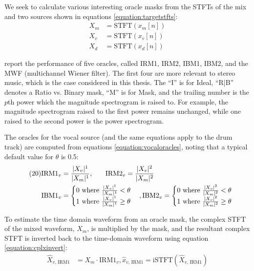 \documentclass[report.tex]{subfiles}
\begin{document}
We seek to calculate various interesting oracle masks from the STFTs of the mix and two sources shown in equations \eqref{equation:targetstfts}:
\begin{align}\tag{19}\label{equation:targetstfts}
	\nonumber X_{m} &= \text{STFT}(x_{m}[n])\\
	\nonumber X_{v} &= \text{STFT}(x_{v}[n])\\
	\nonumber X_{d} &= \text{STFT}(x_{d}[n])
\end{align}
 
\textcite{sisec2018} report the performance of five oracles, called IRM1, IRM2, IBM1, IBM2, and the MWF (multichannel Wiener filter). The first four are more relevant to stereo music, which is the case considered in this thesis. The ``I'' is for Ideal, ``R|B'' denotes a Ratio vs. Binary mask, ``M'' is for Mask, and the trailing number is the $p$th power which the magnitude spectrogram is raised to. For example, the magnitude spectrogram raised to the first power remains unchanged, while one raised to the second power is the power spectrogram.

The oracles for the vocal source (and the same equations apply to the drum track) are computed from equations \eqref{equation:vocaloracles}, noting that a typical default value for $\theta$ is 0.5:
\begin{align}\tag{20}\label{equation:vocaloracles}
	\nonumber \text{IRM1}_{v} &= \frac{|X_{v}|^{1}}{|X_{m}|^{1}}\text{,\qquad}
	\nonumber \text{IRM2}_{v} = \frac{|X_{v}|^{2}}{|X_{m}|^{2}}\\
	\nonumber \text{IBM1}_{v} &= \begin{cases}
		0 \text{ where } \frac{|X_{v}|^{1}}{|X_{m}|^{1}} < \theta\\
		1 \text{ where } \frac{|X_{v}|^{1}}{|X_{m}|^{1}} \ge \theta
	\end{cases},
	\nonumber \text{IBM2}_{v} = \begin{cases}
		0 \text{ where } \frac{|X_{v}|^{2}}{|X_{m}|^{2}} < \theta\\
		1 \text{ where } \frac{|X_{v}|^{2}}{|X_{m}|^{2}} \ge \theta
	\end{cases}
\end{align}

To estimate the time domain waveform from an oracle mask, the complex STFT of the mixed waveform, $X_{m}$, is multiplied by the mask, and the resultant complex STFT is inverted back to the time-domain waveform using equation \eqref{equation:cplxinvert}:
\begin{align}\tag{21}\label{equation:cplxinvert}
	\nonumber \hat{X}_{v\text{, IRM1}} &= X_{m} \cdot \text{IRM1}_{v}, \hat{x}_{v\text{, IRM1}} = \text{iSTFT}(\hat{X}_{v\text{, IRM1}})
\end{align}
\end{document}
